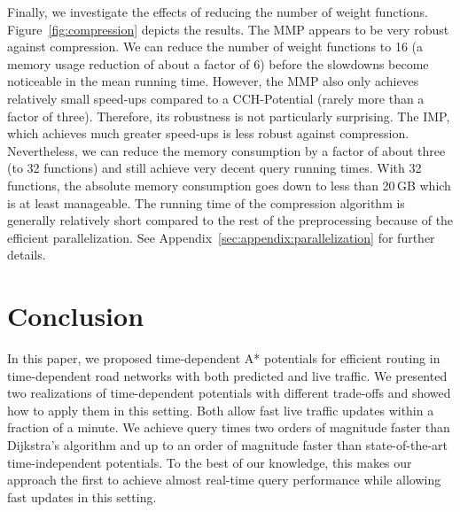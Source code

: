 \documentclass[a4paper,UKenglish,cleveref, autoref, thm-restate,anonymous]{lipics-v2021}
\begin{document}
Finally, we investigate the effects of reducing the number of weight functions.
Figure~\ref{fig:compression} depicts the results.
The MMP appears to be very robust against compression.
We can reduce the number of weight functions to 16 (a memory usage reduction of about a factor of 6) before the slowdowns become noticeable in the mean running time.
However, the MMP also only achieves relatively small speed-ups compared to a CCH-Potential (rarely more than a factor of three).
Therefore, its robustness is not particularly surprising.
The IMP, which achieves much greater speed-ups is less robust against compression.
Nevertheless, we can reduce the memory consumption by a factor of about three (to 32 functions) and still achieve very decent query running times.
With 32 functions, the absolute memory consumption goes down to less than 20\,GB which is at least manageable.
The running time of the compression algorithm is generally relatively short compared to the rest of the preprocessing because of the efficient parallelization.
See Appendix~\ref{sec:appendix:parallelization} for further details.

\section{Conclusion}

In this paper, we proposed time-dependent A* potentials for efficient routing in time-dependent road networks with both predicted and live traffic.
We presented two realizations of time-dependent potentials with different trade-offs and showed how to apply them in this setting.
Both allow fast live traffic updates within a fraction of a minute.
We achieve query times two orders of magnitude faster than Dijkstra's algorithm and up to an order of magnitude faster than state-of-the-art time-independent potentials.
To the best of our knowledge, this makes our approach the first to achieve almost real-time query performance while allowing fast updates in this setting.


\end{document}
